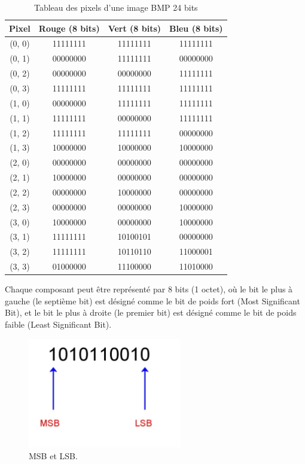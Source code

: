 \documentclass{article}
\begin{document}
\begin{table}[h]
  \centering
  \begin{tabular}{|c|c|c|c|}
    \hline
    \textbf{Pixel} & \textbf{Rouge (8 bits)} & \textbf{Vert (8 bits)} & \textbf{Bleu (8 bits)} \\
    \hline
    (0, 0) & 11111111 & 11111111 & 11111111 \\
    (0, 1) & 00000000 & 11111111 & 00000000 \\
    (0, 2) & 00000000 & 00000000 & 11111111 \\
    (0, 3) & 11111111 & 11111111 & 11111111 \\
    \hline
    (1, 0) & 00000000 & 11111111 & 11111111 \\
    (1, 1) & 11111111 & 00000000 & 11111111 \\
    (1, 2) & 11111111 & 11111111 & 00000000 \\
    (1, 3) & 10000000 & 10000000 & 10000000 \\
    \hline
    (2, 0) & 00000000 & 00000000 & 00000000 \\
    (2, 1) & 10000000 & 00000000 & 00000000 \\
    (2, 2) & 00000000 & 10000000 & 00000000 \\
    (2, 3) & 00000000 & 00000000 & 10000000 \\
    \hline
    (3, 0) & 10000000 & 00000000 & 10000000 \\
    (3, 1) & 11111111 & 10100101 & 00000000 \\
    (3, 2) & 11111111 & 10110110 & 11000001 \\
    (3, 3) & 01000000 & 11100000 & 11010000 \\
    \hline
  \end{tabular}
  \caption{Tableau des pixels d'une image BMP 24 bits}
  \label{}
\end{table}
Chaque composant peut être représenté par 8 bits (1 octet), où le bit le plus à gauche (le septième bit) est désigné comme le bit de poids fort (Most Significant Bit), et le bit le plus à droite (le premier bit) est désigné comme le bit de poids faible (Least Significant Bit).
\begin{figure}[h]
  \centering
  \includegraphics[width=0.6\textwidth]{bit.jpg}
  \caption{MSB et LSB.}
\end{figure}\\
\end{document}
